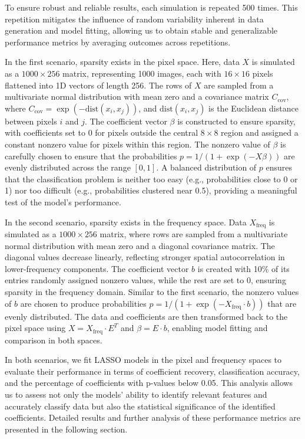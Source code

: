 \documentclass[12pt]{article}
\begin{document}
To ensure robust and reliable results, each simulation is repeated 500 times. This repetition mitigates the influence of random variability inherent in data generation and model fitting, allowing us to obtain stable and generalizable performance metrics by averaging outcomes across repetitions.

In the first scenario, sparsity exists in the pixel space. Here, data \( X \) is simulated as a \( 1000 \times 256 \) matrix, representing 1000 images, each with \( 16 \times 16 \) pixels flattened into 1D vectors of length 256. The rows of \( X \) are sampled from a multivariate normal distribution with mean zero and a covariance matrix \( C_{\text{cov}} \), where \( C_{\text{cov}} = \exp(-\text{dist}(x_i, x_j)) \), and \( \text{dist}(x_i, x_j) \) is the Euclidean distance between pixels \( i \) and \( j \). The coefficient vector \( \beta \) is constructed to ensure sparsity, with coefficients set to 0 for pixels outside the central \( 8 \times 8 \) region and assigned a constant nonzero value for pixels within this region. The nonzero value of \( \beta \) is carefully chosen to ensure that the probabilities \( p = 1 / (1 + \exp(-X \beta)) \) are evenly distributed across the range \( [0, 1] \). A balanced distribution of \( p \) ensures that the classification problem is neither too easy (e.g., probabilities close to 0 or 1) nor too difficult (e.g., probabilities clustered near 0.5), providing a meaningful test of the model's performance.

In the second scenario, sparsity exists in the frequency space. Data \( X_{\text{freq}} \) is simulated as a \( 1000 \times 256 \) matrix, where rows are sampled from a multivariate normal distribution with mean zero and a diagonal covariance matrix. The diagonal values decrease linearly, reflecting stronger spatial autocorrelation in lower-frequency components. The coefficient vector \( b \) is created with 10\% of its entries randomly assigned nonzero values, while the rest are set to 0, ensuring sparsity in the frequency domain. Similar to the first scenario, the nonzero values of \( b \) are chosen to produce probabilities \( p = 1 / (1 + \exp(-X_{\text{freq}} \cdot b)) \) that are evenly distributed. The data and coefficients are then transformed back to the pixel space using \( X = X_{\text{freq}} \cdot E^T \) and \( \beta = E \cdot b \), enabling model fitting and comparison in both spaces.

In both scenarios, we fit LASSO models in the pixel and frequency spaces to evaluate their performance in terms of coefficient recovery, classification accuracy, and the percentage of coefficients with p-values below 0.05. This analysis allows us to assess not only the models' ability to identify relevant features and accurately classify data but also the statistical significance of the identified coefficients. Detailed results and further analysis of these performance metrics are presented in the following section.
\end{document}
